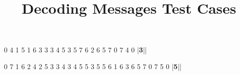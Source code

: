 \documentclass{../../codeproblem}
\begin{document}
\title{Decoding Messages Test Cases}

\begin{example}
0 4
1 5
1 6
3 3
3 4
5 3
5 7
6 2
6 5
7 0
7 4
0
|\textbf{3}||\end{example}

\begin{example}
0 7
1 6
2 4
2 5
3 3
4 3
4 5
5 3
5 5
6 1
6 3
6 5
7 0
7 5
0
|\textbf{5}||\end{example}
\end{document}
